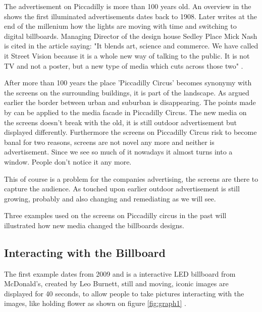 \documentclass[a4paper, 11pt]{article}
\begin{document}
The advertisement on Piccadilly is more than 100 years old. An overview in the \cite{telegraph2011} shows the first illuminated advertisements dates back to 1908. Later \cite{nelson1998} writes at the end of the millenium how the lights are moving with time and switching to digital billboards. Managing Director of the design house Sedley Place Mick Nash is cited in the article saying: "It blends art, science and commerce. We have called it Street Vision because it is a whole new way of talking to the public. It is not TV and not a poster, but a new type of media which cuts across those two" \cite{nelson1998}.

After more than 100 years the place 'Piccadilly Circus' becomes synonymy with the screens on the surrounding buildings, it is part of the landscape. As \cite{Slaatta2006} argued earlier the border between urban and suburban is disappearing. The points made by \cite{Graham} can be applied to the media facade in Piccadilly Circus. The new media on the screens doesn't break with the old, it is still outdoor advertisement but displayed differently. Furthermore the screens on Piccadilly Circus risk to become banal for two reasons, screens are not novel any more and neither is advertisement. Since we see so much of it nowadays it almost turns into a window. People don't notice it any more.

This of course is a problem for the companies advertising, the screens are there to capture the audience. As touched upon earlier outdoor advertisement is still growing, probably and also changing and remediating as we will see. 

Three examples used on the screens on Piccadilly circus in the past will illustrated how new media changed the billboards designs.

\subsection {Interacting with the Billboard}

The first example dates from 2009 and is a interactive LED billboard from McDonald's, created by Leo Burnett, still and moving, iconic images are displayed for 40 seconds, to allow people to take pictures interacting with the images, like holding flower as shown on figure \ref{fig:graph1} \citep{campaign2009}. 
\end{document}
